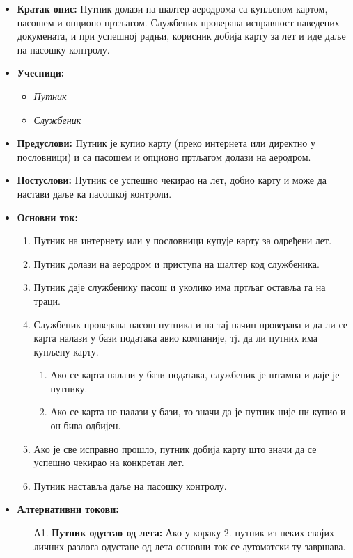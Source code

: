 \documentclass{article}
\begin{document}
\begin{itemize}
    \item \textbf{Кратак опис:} Путник долази на шалтер аеродрома са купљеном картом, пасошем и опционо пртљагом. Службеник проверава исправност наведених докумената, и при успешној радњи, корисник добија карту за лет и иде даље на пасошку контролу.
    \item \textbf{Учесници:}
        \begin{itemize}
            \item \textit{Путник}
            \item \textit{Службеник}
        \end{itemize}
    \item \textbf{Предуслови:} Путник је купио карту (преко интернета или директно у пословници) и са пасошем и опционо пртљагом долази на аеродром.
    \item \textbf{Постуслови:} Путник се успешно чекирао на лет, добио карту и може да настави даље ка пасошкој контроли.
    \item \textbf{Основни ток:}
        \begin{enumerate}
            \item Путник на интернету или у пословници купује карту за одређени лет.
            \item Путник долази на аеродром и приступа на шалтер код службеника.
            \item Путник даје службенику пасош и уколико има пртљаг оставља га на траци.
            \item Службеник проверава пасош путника и на тај начин проверава и да ли се карта налази у бази података авио компаније, тј. да ли путник има купљену карту.
                \begin{enumerate}
                    \item Ако се карта налази у бази података, службеник је штампа и даје је путнику.
                    \item Ако се карта не налази у бази, то значи да је путник није ни купио и он бива одбијен. 
                \end{enumerate}
            \item Ако је све исправно прошло, путник добија карту што значи да се успешно чекирао на конкретан лет.
            \item Путник наставља даље на пасошку контролу.
        \end{enumerate}
    
    \item \textbf{Алтернативни токови:}
    \begin{itemize}
        \item[А1.] \textbf{Путник одустао од лета:} Ако у кораку 2. путник из неких својих личних разлога одустане од лета основни ток се аутоматски ту завршава.
    \end{itemize}
   
\end{itemize}
\end{document}

